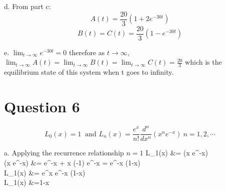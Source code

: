 \documentclass[12pt,twoside]{article}
\begin{document}
\item [d.]
From part c:
\[
	A(t) = \frac{20}{3} (1 + 2 e^{-30t})
\]
\[
	B(t) = C(t) =  \frac{20}{3} (1 - e^{-30t})
\]

\item [e.]
$\lim_{t \rightarrow \infty} e^{-30t} = 0$ therefore as $t \rightarrow \infty$, $\lim_{t \rightarrow \infty}  A(t) = \lim_{t \rightarrow \infty}  B(t)  = \lim_{t \rightarrow \infty}  C(t) = \frac{20}{3}$ which is the equilibrium state of this system
when t goes to infinity.

\ee

\section*{Question 6}
\[
	L_0(x) = 1 ~ \text{ and } L_n(x) = \frac{e^x}{n!} \frac{d^n}{dx^n}(x^n e^{-x}) ~ n = 1,2,\cdots
\]

\be
\item [a.]
Applying the recurrence relationship
\newpage
$n=1$
\ba
	L_1(x) 				&=    (x e^{-x}) \\
	  (x e^{-x})	&= e^{-x} + x (-1)  e^{-x}  =  e^{-x} (1-x) \\
	L_1(x) 				&= e^x e^{-x} (1-x)  \\	 
	L_1(x) 				&=1-x \\	 
\ea
\end{document}
